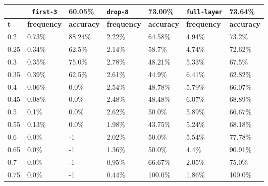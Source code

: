 
\begin{table}[t]
\centering
\begin{tabular}{lllllll} %
\hline

\multicolumn{1}{c}{}& 
\multicolumn{1}{c}{\texttt{first-3}} & \multicolumn{1}{l|}{60.05\%} 
& \multicolumn{1}{l}{\texttt{drop-8}} & \multicolumn{1}{l|}{73.00\%}
& \multicolumn{1}{l}{\texttt{full-layer}} & 73.64\%
\\ \hline
\multicolumn{1}{l|}{\textbf{t}} &
\multicolumn{1}{l|}{\textbf{frequency}} & 
\multicolumn{1}{l|}{\textbf{accuracy}} & 
\multicolumn{1}{l|}{\textbf{frequency}} & 
\multicolumn{1}{l|}{\textbf{accuracy}} & 
\multicolumn{1}{l|}{\textbf{frequency}} & 
\multicolumn{1}{l|}{\textbf{accuracy}} \\ \hline
	\multicolumn{1}{l|}{0.2}&  0.73\% & \multicolumn{1}{l|}{88.24\%}& 2.22\% & \multicolumn{1}{l|}{64.58\%}& 4.94\% & 73.2\%\\ 
\multicolumn{1}{l|}{0.25}&  0.34\% & \multicolumn{1}{l|}{62.5\%}& 2.14\% & \multicolumn{1}{l|}{58.7\%}& 4.74\% & 72.62\%\\ 
\multicolumn{1}{l|}{0.3}&  0.35\% & \multicolumn{1}{l|}{75.0\%}& 2.78\% & \multicolumn{1}{l|}{48.21\%}& 5.33\% & 67.5\%\\ 
\multicolumn{1}{l|}{0.35}&  0.39\% & \multicolumn{1}{l|}{62.5\%}& 2.61\% & \multicolumn{1}{l|}{44.9\%}& 6.41\% & 62.82\%\\ 
\multicolumn{1}{l|}{0.4}&  0.06\% & \multicolumn{1}{l|}{0.0\%}& 2.54\% & \multicolumn{1}{l|}{48.78\%}& 5.79\% & 66.07\%\\ 
\multicolumn{1}{l|}{0.45}&  0.08\% & \multicolumn{1}{l|}{0.0\%}& 2.48\% & \multicolumn{1}{l|}{48.48\%}& 6.07\% & 68.89\%\\ 
\multicolumn{1}{l|}{0.5}&  0.1\% & \multicolumn{1}{l|}{0.0\%}& 2.62\% & \multicolumn{1}{l|}{50.0\%}& 5.89\% & 66.67\%\\ 
\multicolumn{1}{l|}{0.55}&  0.13\% & \multicolumn{1}{l|}{0.0\%}& 1.98\% & \multicolumn{1}{l|}{43.75\%}& 5.24\% & 68.18\%\\ 
\multicolumn{1}{l|}{0.6}&  0.0\% & \multicolumn{1}{l|}{-1}& 2.02\% & \multicolumn{1}{l|}{50.0\%}& 5.54\% & 77.78\%\\ 
\multicolumn{1}{l|}{0.65}&  0.0\% & \multicolumn{1}{l|}{-1}& 1.36\% & \multicolumn{1}{l|}{50.0\%}& 4.4\% & 90.91\%\\ 
\multicolumn{1}{l|}{0.7}&  0.0\% & \multicolumn{1}{l|}{-1}& 0.95\% & \multicolumn{1}{l|}{66.67\%}& 2.05\% & 75.0\%\\ 
\multicolumn{1}{l|}{0.75}&  0.0\% & \multicolumn{1}{l|}{-1}& 0.44\% & \multicolumn{1}{l|}{100.0\%}& 1.86\% & 100.0\%\\ 

\end{tabular}
\end{table}
